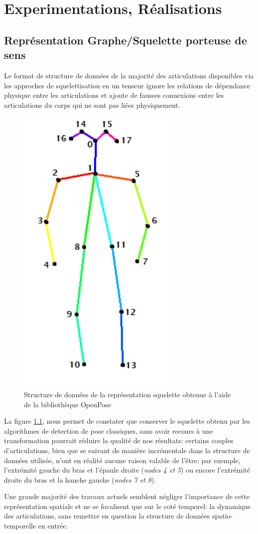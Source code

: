 \clearpage
\chapter{Experimentations, Réalisations}
\label{sec:SOTA}

\section{Représentation Graphe/Squelette porteuse de sens}
Le format de structure de données de la majorité des articulations disponibles via les approches de squelettisation en un tenseur ignore les relations de dépendance physique entre les articulations et ajoute de fausses connexions entre les articulations du corps qui ne sont pas liées physiquement.

\begin{figure}[H]
    \centering
    \includegraphics[width=0.3\linewidth]{Images/openpose.png}
    \caption{Structure de données de la représentation squelette obtenue à l'aide de la bibliothèque OpenPose \cite{cao2017realtime}}
    \label{fig:openPoseSkel}
\end{figure}

La figure \ref{fig:openPoseSkel}, nous permet de constater que conserver le squelette obtenu par les algorithmes de detection de pose classiques, sans avoir recours à une transformation pourrait réduire la qualité de nos résultats: certains couples d'articulations, bien que se suivant de manière incrémentale dans la structure de données utilisée, n'ont en réalité aucune raison valable de l'être: par exemple, l'extrémité gauche du bras et l'épaule droite (\textit{nodes 4 et 5}) ou encore l'extrémité droite du bras et la hanche gauche (\textit{nodes 7 et 8}).

Une grande majorité des travaux actuels semblent négliger l'importance de cette représentation spatiale et ne se focalisent que sur le coté temporel: la dynamique des articulations, sans remettre en question la structure de données spatio-temporelle en entrée.

